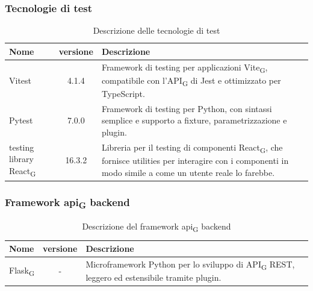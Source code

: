 \documentclass[11pt,a4paper]{article}
\newcommand{\gls}[1]{#1\textsubscript{G}}
\begin{document}
\subsubsection{Tecnologie di test}
    \begin{table}[H]
        \centering
        \begin{tabular}{|l|c|>{\raggedright\arraybackslash}p{}|p{}|}
            \hline
            \textbf{Nome} & \textbf{versione} & \textbf{Descrizione} \\
            \hline
            Vitest & 4.1.4 & Framework di testing per applicazioni \gls{Vite}, compatibile con l'\gls{API} di Jest e ottimizzato per TypeScript. \\
            \hline
            Pytest & 7.0.0 & Framework di testing per Python, con sintassi semplice e supporto a fixture, parametrizzazione e plugin. \\
            \hline
            testing library \gls{React} & 16.3.2 & Libreria per il testing di componenti \gls{React}, che fornisce utilities per interagire con i componenti in modo simile a come un utente reale lo farebbe. \\
            \hline
        \end{tabular}
        \caption{Descrizione delle tecnologie di test}
        \label{tab:tecnologie_test}
    \end{table}
\subsubsection{Framework \gls{api} backend}
    \begin{table}[H]
        \centering
        \begin{tabular}{|l|c|>{\raggedright\arraybackslash}p{}|p{}|}
            \hline
            \textbf{Nome} & \textbf{versione} & \textbf{Descrizione} \\
            \hline
            \gls{Flask} & - & Microframework Python per lo sviluppo di \gls{API} REST, leggero ed estensibile tramite plugin. \\
            \hline
        \end{tabular}
        \caption{Descrizione del framework \gls{api} backend}
        \label{tab:api_backend}
    \end{table}
\end{document}

